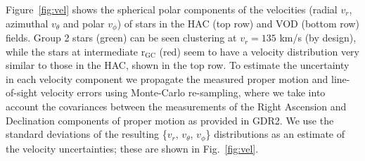 \documentclass[fleqn,usenatbib]{mnras}
\begin{document}
Figure~\ref{fig:vel} shows the spherical polar components of the
velocities (radial $v_{r}$, azimuthal $v_{\theta}$ and polar
$v_{\phi}$) of stars in the HAC (top row) and VOD (bottom row)
fields. Group 2 stars (green) can be seen clustering at $v_{r} = 135$
km/s (by design), while the stars at intermediate $\mathrm{r_{GC}}$
(red) seem to have a velocity distribution very similar to those in
the HAC, shown in the top row. To estimate the uncertainty in each
velocity component we propagate the measured proper motion and
line-of-sight velocity errors using Monte-Carlo re-sampling, where we
take into account the covariances between the measurements of the
Right Ascension and Declination components of proper motion as
provided in GDR2. We use the standard deviations of the resulting
\{$v_{r}$, $v_{\theta}$, $v_{\phi}$\} distributions as an estimate
of the velocity uncertainties; these are shown in Fig.~\ref{fig:vel}.
%
%
%
\end{document}
